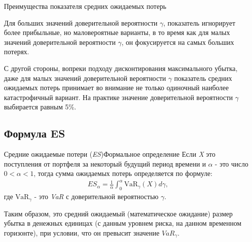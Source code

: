 \documentclass[_fin_decisions_lectures.tex]{subfiles}
\begin{document}
\begin{frame}[allowframebreaks]{Преимущества показателя средних ожидаемых потерь}
\pagebreak

Для больших значений доверительной вероятности $\gamma$, показатель игнорирует более прибыльные, но маловероятные варианты, в то время как для малых значений доверительной вероятности $\gamma$, он фокусируется на самых больших потерях. 

\pagebreak
С другой стороны, вопреки подходу дисконтирования максимального убытка, даже для малых значений доверительной вероятности $\gamma$ показатель средних ожидаемых потерь принимает во внимание не только одиночный наиболее катастрофичный вариант. 
На практике значение доверительной вероятности $\gamma$ выбирается равным 5\%.

\end{frame}
\subsection{Формула ES}
\begin{frame}[ allowframebreaks ]{Средние ожидаемые потери (\textit{ES})}{Формальное определение}
Если \textit{X }это поступления от портфеля за некоторый будущий период времени и $\alpha$ - это число $0<\alpha<1$, тогда сумма ожидаемых потерь определяется по формуле:
\begin{align}
\label{es}
ES_{\alpha} = \frac{1}{\alpha}\int_0^{\alpha} \mbox{VaR}_{\gamma}(X)d\gamma,
\end{align}
где  $\mbox{VaR}_{\gamma}$ - это \textit{VaR} с доверительной вероятностью $\gamma$.

\pagebreak
Таким образом, это средний ожидаемый (математическое ожидание) размер убытка в денежных единицах (с данным уровнем риска, на данном временном горизонте), при условии, что он превысит значение $VaR_{\gamma}$.
\end{frame}
\end{document}
